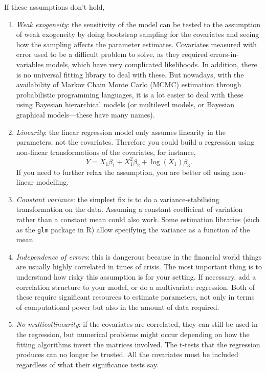 \documentclass{article}
\theoremstyle{definition}
\theoremstyle{remark}
\theoremstyle{definition}
\begin{document}
If these assumptions don't hold, 
\begin{enumerate}
  \item \textit{Weak exogeneity}: the sensitivity of the model can be tested to the assumption of weak exogeneity by doing bootstrap sampling for the covariates and seeing how the sampling affects the parameter estimates.
  Covariates measured with error used to be a difficult problem to solve, as they required errors-in-variables models, which have very complicated likelihoods. In addition, there is no universal fitting library to deal with these. But nowadays, with the availability of Markov Chain Monte Carlo (MCMC) estimation through probabilistic programming languages, it is a lot easier to deal with these using Bayesian hierarchical models (or multilevel models, or Bayesian graphical models---these have many names).
  \item \textit{Linearity}: the linear regression model only assumes linearity in the parameters, not the covariates. Therefore you could build a regression using non-linear transformations of the covariates, for instance,
  \[
    Y = X_1 \beta_1 +
        X_1^2 \beta_2 +
        \log(X_1) \beta_3
    \text{.}
  \]
  If you need to further relax the assumption, you are better off using non-linear modelling. 
  \item \textit{Constant variance}: the simplest fix is to do a variance-stabilising transformation on the data. Assuming a constant coefficient of variation rather than a constant mean could also work. Some estimation libraries (such as the \verb+glm+ package in R) allow specifying the variance as a function of the mean.
  \item \textit{Independence of errors}: this is dangerous because in the financial world things are usually highly correlated in times of crisis. The most important thing is to understand how risky this assumption is for your setting. If necessary, add a correlation structure to your model, or do  a multivariate regression. Both of these require significant resources to estimate parameters, not only in terms of computational power but also in the amount of data required.
  \item \textit{No multicollinearity}:  
  if the covariates are correlated, they can still be used in the regression, but numerical problems might occur depending on how the fitting algorithms invert the matrices involved.
  The t-tests that the regression produces can no longer be trusted. All the covariates must be included regardless of what their significance tests say.

\end{enumerate}
\end{document}
